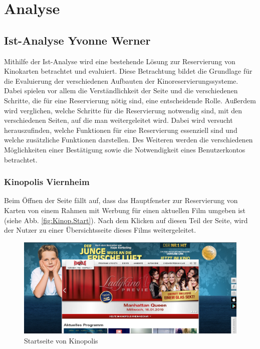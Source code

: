 \chapter{Analyse} \label{analyse}
	
	
	\section[Ist-Analyse]{Ist-Analyse {\hfill \normalsize Yvonne Werner}}
	Mithilfe der Ist-Analyse wird eine bestehende Lösung zur Reservierung von Kinokarten betrachtet und evaluiert. Diese Betrachtung bildet die Grundlage für die Evaluierung der verschiedenen Aufbauten der Kinoreservierungssysteme. Dabei spielen vor allem die Verständlichkeit der Seite und die verschiedenen Schritte, die für eine Reservierung nötig sind, eine entscheidende Rolle. Außerdem wird verglichen, welche Schritte für die Reservierung notwendig sind, mit den verschiedenen Seiten, auf die man weitergeleitet wird. Dabei wird versucht herauszufinden, welche Funktionen für eine Reservierung essenziell sind und welche zusätzliche Funktionen darstellen. Des Weiteren werden die verschiedenen Möglichkeiten einer Bestätigung sowie die Notwendigkeit eines Benutzerkontos betrachtet. 
	
	\subsection{Kinopolis Viernheim}
	Beim Öffnen der Seite fällt auf, dass das Hauptfenster zur Reservierung von Karten von einem Rahmen mit Werbung für einen aktuellen Film umgeben ist (siehe Abb. \vref{fig:Kinop.Start}). Nach dem Klicken auf diesen Teil der Seite, wird der Nutzer zu einer Übersichtsseite dieses Films weitergeleitet. 
	\begin{figure}[H]
		\centering 
		\includegraphics[scale=0.38]{img/Kinopolis_MA_Startseite.png}
		\captionsetup{format=hang}
		\centering\caption[Startseite von Kinopolis Viernheim]{\label{fig:Kinop.Start}Startseite von Kinopolis\footnotemark}
	\end{figure} 

